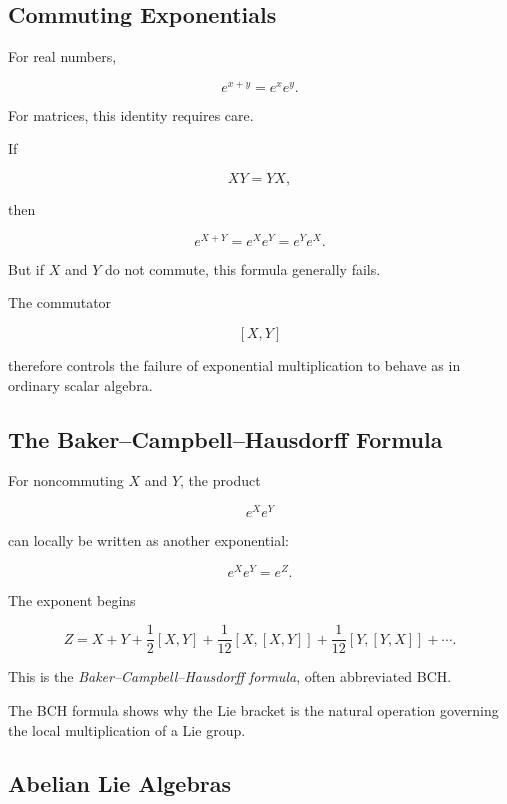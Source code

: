 \subsection{Commuting Exponentials}
\label{subsec:commuting-exponentials}

For real numbers,

\[ e^{x+y}=e^xe^y. \]

For matrices, this identity requires care.

If

\[ XY=YX, \]

then

\[ \boxed{e^{X+Y}=e^Xe^Y=e^Ye^X.} \]

But if \(X\) and \(Y\) do not commute, this formula generally fails.

The commutator

\[ [X,Y] \]

therefore controls the failure of exponential multiplication to behave as in
ordinary scalar algebra.

\subsection{The Baker--Campbell--Hausdorff Formula}
\label{subsec:bch-formula}

For noncommuting \(X\) and \(Y\), the product

\[ e^Xe^Y \]

can locally be written as another exponential:

\[ e^Xe^Y=e^Z. \]

The exponent begins

\[ Z=X+Y+\frac12[X,Y]
+\frac1{12}[X,[X,Y]]
+\frac1{12}[Y,[Y,X]]+\cdots. \]

This is the \emph{Baker--Campbell--Hausdorff formula}, often abbreviated BCH.

\begin{importantbox}
The BCH formula shows why the Lie bracket is the natural operation governing
the local multiplication of a Lie group.
\end{importantbox}

\subsection{Abelian Lie Algebras}
\label{subsec:abelian-lie-algebras}

